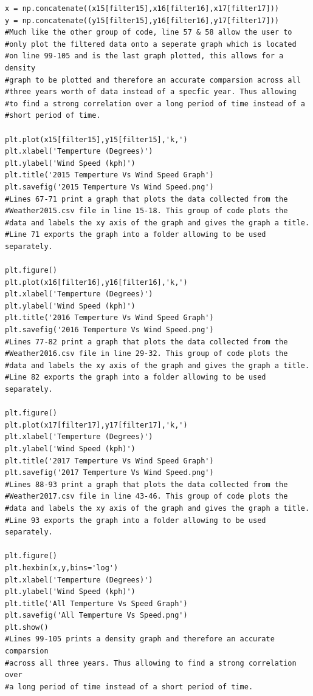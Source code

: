 \documentclass[12pt]{article}
\begin{document}
\begin{verbatim}
x = np.concatenate((x15[filter15],x16[filter16],x17[filter17]))
y = np.concatenate((y15[filter15],y16[filter16],y17[filter17]))
#Much like the other group of code, line 57 & 58 allow the user to 
#only plot the filtered data onto a seperate graph which is located
#on line 99-105 and is the last graph plotted, this allows for a density 
#graph to be plotted and therefore an accurate comparsion across all 
#three years worth of data instead of a specfic year. Thus allowing 
#to find a strong correlation over a long period of time instead of a 
#short period of time.

plt.plot(x15[filter15],y15[filter15],'k,')
plt.xlabel('Temperture (Degrees)')
plt.ylabel('Wind Speed (kph)')
plt.title('2015 Temperture Vs Wind Speed Graph')
plt.savefig('2015 Temperture Vs Wind Speed.png')
#Lines 67-71 print a graph that plots the data collected from the
#Weather2015.csv file in line 15-18. This group of code plots the 
#data and labels the xy axis of the graph and gives the graph a title.
#Line 71 exports the graph into a folder allowing to be used separately.

plt.figure()
plt.plot(x16[filter16],y16[filter16],'k,')
plt.xlabel('Temperture (Degrees)')
plt.ylabel('Wind Speed (kph)')
plt.title('2016 Temperture Vs Wind Speed Graph')
plt.savefig('2016 Temperture Vs Wind Speed.png')
#Lines 77-82 print a graph that plots the data collected from the
#Weather2016.csv file in line 29-32. This group of code plots the 
#data and labels the xy axis of the graph and gives the graph a title.
#Line 82 exports the graph into a folder allowing to be used separately.

plt.figure()
plt.plot(x17[filter17],y17[filter17],'k,')
plt.xlabel('Temperture (Degrees)')
plt.ylabel('Wind Speed (kph)')
plt.title('2017 Temperture Vs Wind Speed Graph')
plt.savefig('2017 Temperture Vs Wind Speed.png')
#Lines 88-93 print a graph that plots the data collected from the
#Weather2017.csv file in line 43-46. This group of code plots the 
#data and labels the xy axis of the graph and gives the graph a title.
#Line 93 exports the graph into a folder allowing to be used separately.

plt.figure()
plt.hexbin(x,y,bins='log')
plt.xlabel('Temperture (Degrees)')
plt.ylabel('Wind Speed (kph)')
plt.title('All Temperture Vs Speed Graph')
plt.savefig('All Temperture Vs Speed.png')
plt.show()
#Lines 99-105 prints a density graph and therefore an accurate comparsion 
#across all three years. Thus allowing to find a strong correlation over 
#a long period of time instead of a short period of time.

\end{verbatim}
\end{document}
